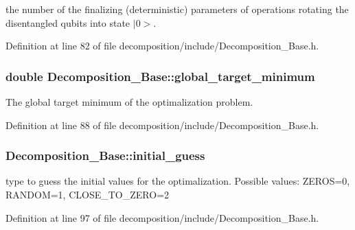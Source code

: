 the number of the finalizing (deterministic) parameters of operations rotating the disentangled qubits into state $\vert$0$>$. 



Definition at line 82 of file decomposition/include/\+Decomposition\+\_\+\+Base.\+h.

\subsubsection[{\texorpdfstring{global\+\_\+target\+\_\+minimum}{global_target_minimum}}]{\setlength{\rightskip}{0pt plus 5cm}double Decomposition\+\_\+\+Base\+::global\+\_\+target\+\_\+minimum\hspace{0.3cm}{\ttfamily [protected]}}\hypertarget{class_decomposition___base_a6bc9e026221fab165ecc56f287d731a8}{}\label{class_decomposition___base_a6bc9e026221fab165ecc56f287d731a8}


The global target minimum of the optimalization problem. 



Definition at line 88 of file decomposition/include/\+Decomposition\+\_\+\+Base.\+h.

\subsubsection[{\texorpdfstring{initial\+\_\+guess}{initial_guess}}]{ Decomposition\+\_\+\+Base\+::initial\+\_\+guess\hspace{0.3cm}{\ttfamily [protected]}}\hypertarget{class_decomposition___base_ad8df090247ebaea3ebb69e7737b194b9}{}\label{class_decomposition___base_ad8df090247ebaea3ebb69e7737b194b9}


type to guess the initial values for the optimalization. Possible values\+: Z\+E\+R\+OS=0, R\+A\+N\+D\+OM=1, C\+L\+O\+S\+E\+\_\+\+T\+O\+\_\+\+Z\+E\+RO=2 



Definition at line 97 of file decomposition/include/\+Decomposition\+\_\+\+Base.\+h.


